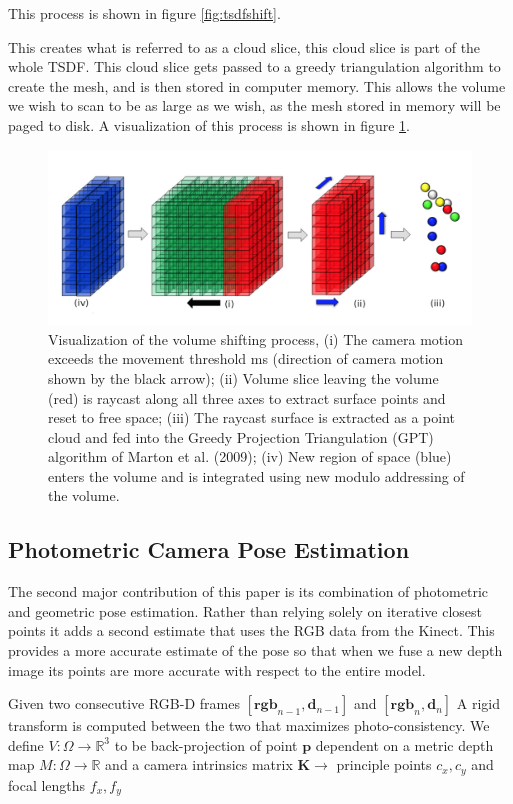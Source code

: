 \documentclass[10pt, twocolumn]{article}
\begin{document}
This process is shown in figure \ref{fig:tsdfshift}.


This creates what is referred to as a cloud slice, this cloud slice is part of the whole TSDF. This cloud slice gets passed to a greedy triangulation algorithm to create the mesh, and is then stored in computer memory. This allows the volume we wish to scan to be as large as we wish, as the mesh stored in memory will be paged to disk. A visualization of this process is shown in figure \ref{fig:cloudslice}.

\begin{figure}
  \centering
  \includegraphics[width=1.0\linewidth]{cloudslice}
  \caption{Visualization of the volume shifting process, (i) The camera motion exceeds the movement threshold ms (direction of camera motion shown by the black arrow); (ii) Volume slice leaving the volume (red) is raycast along all three axes to extract surface points and reset to free space; (iii) The raycast surface is extracted as a point cloud and fed into the Greedy Projection Triangulation (GPT) algorithm of Marton et al. (2009); (iv) New region of space (blue) enters the volume and is integrated using new modulo addressing of the volume.}
  \label{fig:cloudslice}
\end{figure}



\subsection{Photometric Camera Pose Estimation}
The second major contribution of this paper is its combination of photometric and geometric pose estimation. Rather than relying solely on iterative closest points it adds a second estimate that uses the RGB data from the Kinect. This provides a more accurate estimate of the pose so that when we fuse a new depth image its points are more accurate with respect to the entire model.

Given two consecutive RGB-D frames $[\mathbf{rgb}_{n-1}, \mathbf{d}_{n-1}]$ and $[\mathbf{rgb}_{n}, \mathbf{d}_{n}]$
A rigid transform is computed between the two that maximizes photo-consistency. 
We define $V: \Omega \rightarrow \mathbb{R}^{3}$ to be back-projection of point $\mathbf{p}$ dependent on
a metric depth map $M: \Omega \rightarrow \mathbb{R}$ and
a camera intrinsics matrix $\mathbf{K} \rightarrow$ principle points $c_{x}, c_{y}$ and focal lengths $f_{x}, f_{y}$ 
\end{document}
